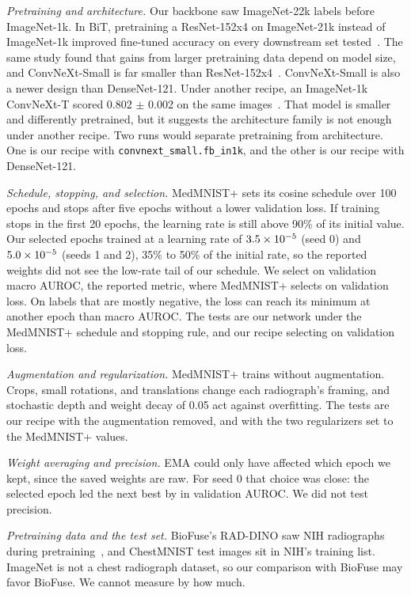 \documentclass[conference]{IEEEtran}
\newif\ifanycitation
\let\citeAnyKey\cite
\renewcommand{\cite}{\global\anycitationtrue\citeAnyKey}
\begin{document}
\emph{Pretraining and architecture.} Our backbone saw ImageNet-22k labels before
ImageNet-1k. In BiT, pretraining a ResNet-152x4 on ImageNet-21k instead of ImageNet-1k
improved fine-tuned accuracy on every downstream set tested~\cite{kolesnikov2020bit}.
The same study found that gains from larger pretraining data depend on model size, and
ConvNeXt-Small is far smaller than ResNet-152x4~\cite{kolesnikov2020bit}.
ConvNeXt-Small is also a newer design than DenseNet-121. Under another recipe, an
ImageNet-1k ConvNeXt-T scored 0.802 $\pm$ 0.002 on the same
images~\cite{farooq2026mambavision}. That model is smaller and differently pretrained, but
it suggests the architecture family is not enough under another recipe. Two runs would separate pretraining from architecture. One is our recipe with
\texttt{convnext\_small.fb\_in1k}, and the other is our recipe with DenseNet-121.

\emph{Schedule, stopping, and selection.} MedMNIST+ sets its cosine schedule over 100
epochs and stops after five epochs without a lower validation loss. If training stops in
the first 20 epochs, the learning rate is still above 90\% of its initial value. Our
selected epochs trained at a learning rate of $3.5\times10^{-5}$ (seed 0)
and $5.0\times10^{-5}$ (seeds 1 and 2), 35\% to 50\% of the initial rate,
so the reported weights did not see the low-rate tail of our schedule. We select on
validation macro AUROC, the reported metric, where MedMNIST+ selects on validation loss. On labels that are
mostly negative, the loss can reach its minimum at another epoch than macro AUROC. The
tests are our network under the MedMNIST+ schedule and stopping rule, and our recipe
selecting on validation loss.

\emph{Augmentation and regularization.} MedMNIST+ trains without augmentation. Crops,
small rotations, and translations change each radiograph's framing, and stochastic depth
and weight decay of 0.05 act against overfitting. The tests are our recipe with the
augmentation removed, and with the two regularizers set to the MedMNIST+ values.

\emph{Weight averaging and precision.} EMA could only have affected which epoch we kept,
since the saved weights are raw. For seed 0 that choice was close: the selected epoch led
the next best by \selectionGapSeedZero{} in validation AUROC. We did not test precision.

\emph{Pretraining data and the test set.} BioFuse's RAD-DINO saw NIH radiographs during
pretraining~\cite{hossain2026biofuse}, and \testFromNihTrain{} ChestMNIST test images sit
in NIH's training list. ImageNet is not a chest radiograph dataset, so our comparison with BioFuse
may favor BioFuse. We cannot measure by how much.
\end{document}
